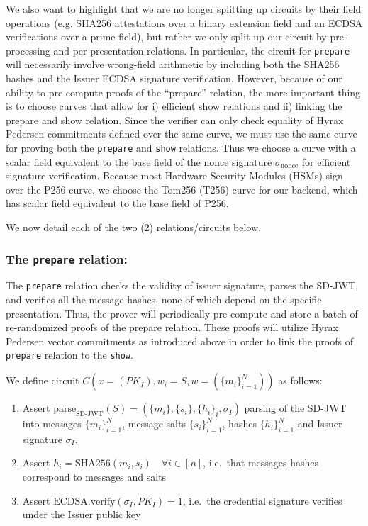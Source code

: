We also want to highlight that we are no longer splitting up circuits by their field operations 
(e.g. SHA256 attestations over a binary extension field and an ECDSA verifications over a prime field), but rather we only split up our circuit by pre-processing and per-presentation relations. 
In particular, the circuit for \texttt{prepare} will necessarily involve wrong-field arithmetic by including both the SHA256 hashes and the Issuer ECDSA signature verification. 
However, because of our ability to pre-compute proofs of the ``prepare'' relation, the more important thing is to choose curves that allow for i) efficient show relations and ii) linking the prepare and show relation. 
Since the verifier can only check equality of Hyrax Pedersen commitments defined over the same curve, we must use the same curve for proving both the \texttt{prepare} and \texttt{show} relations.
Thus we choose a curve with a scalar field equivalent to the base field of the nonce signature $\sigma_{\text{nonce}}$ for efficient signature verification. 
Because most Hardware Security Modules (HSMs) sign over the P256 curve, we choose the Tom256 (T256) curve for our backend, which has scalar field equivalent to the base field of P256. 

We now detail each of the two (2) relations/circuits below.

\subsubsection{The \texttt{prepare} relation:}

The \texttt{prepare} relation checks the validity of issuer signature, parses the SD-JWT, and verifies all the message hashes, none of which depend on the specific presentation. 
Thus, the prover will periodically pre-compute and store a batch of re-randomized proofs of the prepare relation. 
These proofs will utilize Hyrax Pedersen vector commitments as introduced above in order to link the proofs of \texttt{prepare} relation to the \texttt{show}. 

\begin{mdframed}[style=zkprotocolwithheader, frametitle=Circuit $C_1$ for the \texttt{prepare} relation]

We define circuit $C(x = (PK_I), w_i = S, w = (\{m_i\}_{i=1}^N))$ as follows:

\begin{enumerate}
\item Assert $\text{parse}_{\text{SD-JWT}}(S) = (\{m_i\}, \{s_i\}, \{h_i\}_i, \sigma_I)$ parsing of the SD-JWT into messages $\{m_i\}_{i=1}^N$, message salts $\{s_i\}_{i=1}^N$, hashes $\{h_i\}_{i=1}^N$ and Issuer signature $\sigma_I$.
\item Assert $h_i = \text{SHA256}(m_i, s_i) \quad \forall i \in [n]$, i.e.\ that messages hashes correspond to messages and salts
\item Assert $\text{ECDSA.verify}(\sigma_I, PK_I) = 1$, i.e.\ the credential signature verifies under the Issuer public key
\end{enumerate}

\end{mdframed}

